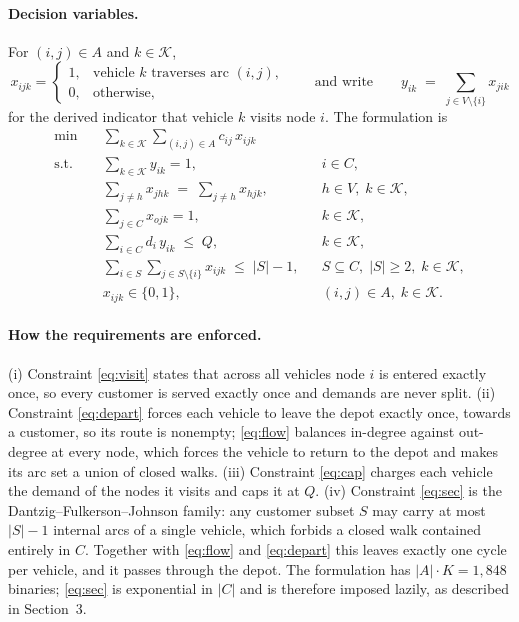 \documentclass[11pt]{article}
\DeclareMathOperator*{\minimize}{min}
\begin{document}
\paragraph{Decision variables.} For $(i,j) \in A$ and $k \in \mathcal{K}$,
\[
  x_{ijk} =
  \begin{cases}
    1, & \text{vehicle } k \text{ traverses arc } (i,j),\\
    0, & \text{otherwise,}
  \end{cases}
  \qquad\text{and write}\qquad
  y_{ik} \;=\; \sum_{j \in V \setminus \{i\}} x_{jik}
\]
for the derived indicator that vehicle $k$ visits node $i$. The
formulation is
\begin{align}
  \minimize \quad & \sum_{k \in \mathcal{K}} \sum_{(i,j) \in A}
      c_{ij}\, x_{ijk} \label{eq:obj}\\
  \text{s.t.}\quad
  & \sum_{k \in \mathcal{K}} y_{ik} = 1,
    && i \in C, \label{eq:visit}\\
  & \sum_{j \neq h} x_{jhk} \;=\; \sum_{j \neq h} x_{hjk},
    && h \in V,\; k \in \mathcal{K}, \label{eq:flow}\\
  & \sum_{j \in C} x_{ojk} = 1,
    && k \in \mathcal{K}, \label{eq:depart}\\
  & \sum_{i \in C} d_i\, y_{ik} \;\le\; Q,
    && k \in \mathcal{K}, \label{eq:cap}\\
  & \sum_{i \in S} \sum_{j \in S \setminus \{i\}} x_{ijk}
      \;\le\; |S| - 1,
    && S \subseteq C,\; |S| \ge 2,\; k \in \mathcal{K},
    \label{eq:sec}\\
  & x_{ijk} \in \{0,1\},
    && (i,j) \in A,\; k \in \mathcal{K}. \label{eq:bin}
\end{align}

\paragraph{How the requirements are enforced.}
(i) Constraint \eqref{eq:visit} states that across all vehicles node
$i$ is entered exactly once, so every customer is served exactly once
and demands are never split. (ii) Constraint \eqref{eq:depart} forces
each vehicle to leave the depot exactly once, towards a customer, so
its route is nonempty; \eqref{eq:flow} balances in-degree against
out-degree at every node, which forces the vehicle to return to the
depot and makes its arc set a union of closed walks. (iii) Constraint
\eqref{eq:cap} charges each vehicle the demand of the nodes it visits
and caps it at $Q$. (iv) Constraint \eqref{eq:sec} is the
Dantzig--Fulkerson--Johnson family: any customer subset $S$ may carry
at most $|S|-1$ internal arcs of a single vehicle, which forbids a
closed walk contained entirely in $C$. Together with \eqref{eq:flow}
and \eqref{eq:depart} this leaves exactly one cycle per vehicle, and it
passes through the depot. The formulation has $|A| \cdot K = 1{,}848$
binaries; \eqref{eq:sec} is exponential in $|C|$ and is therefore
imposed lazily, as described in Section~3.
\end{document}
